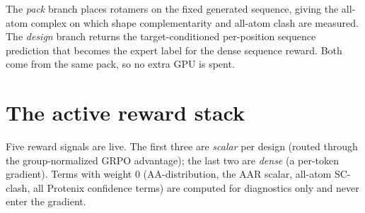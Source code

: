 \documentclass[11pt]{article}
\begin{document}
\begin{center}
\end{center}

The \emph{pack} branch places rotamers on the fixed generated sequence, giving the all-atom
complex on which shape complementarity and all-atom clash are measured. The \emph{design} branch
returns the target-conditioned per-position sequence prediction that becomes the expert label for
the dense sequence reward. Both come from the same pack, so no extra GPU is spent.

\section{The active reward stack}
Five reward signals are live. The first three are \emph{scalar} per design (routed through the
group-normalized GRPO advantage); the last two are \emph{dense} (a per-token gradient). Terms with
weight $0$ (AA-distribution, the AAR scalar, all-atom SC-clash, all Protenix confidence terms) are
computed for diagnostics only and never enter the gradient.
\end{document}

